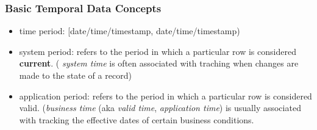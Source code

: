 \documentclass{article}
\begin{document}
\subsubsection{Basic Temporal Data Concepts}
\begin{itemize}
\item time period: {[date/time/timestamp, date/time/timestamp)}
\item system period: refers to the period in which a particular row is considered \textbf{current}. (
\textit{system time} is often associated with traching when changes are made to the state of a record)
\item application period: refers to the period in which a particular row is considered valid. (\textit{business time} (aka \textit{valid time}, \textit{application time}) is usually associated with
tracking the effective dates of certain business conditions.
\end{itemize}
\end{document}
